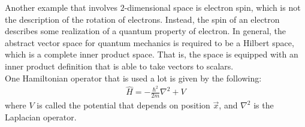 \documentclass[11pt]{book}
\theoremstyle{break}
\theoremstyle{break}
\begin{document}
Another example that involves $2$-dimensional space is electron spin, which is not the description of the rotation of electrons. Instead, the spin of an electron describes some realization of a quantum property of electron. In general, the abstract vector space for quantum mechanics is required to be a Hilbert space, which is a complete inner product space. That is, the space is equipped with an inner product definition that is able to take vectors to scalars.\\

One Hamiltonian operator that is used a lot is given by the following:
\begin{align}
\hat{H} = -\frac{\hbar^2}{2m}\nabla^2 + V
\end{align}
where $V$ is called the potential that depends on position $\vec{x}$, and ${\nabla}^2$ is the Laplacian operator. \\

\newpage	
\end{document}
